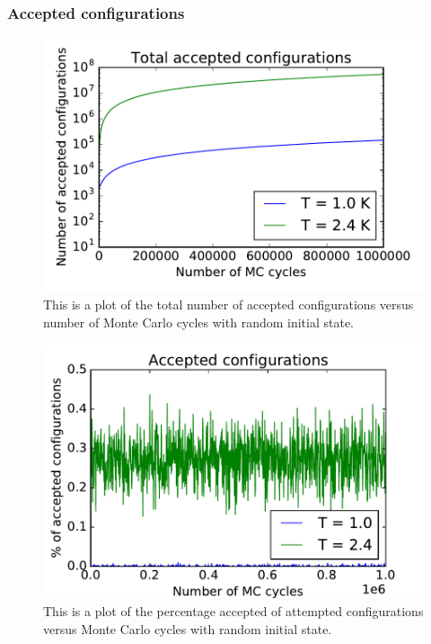\subsubsection{Accepted configurations}

\begin{figure}[H]
\includegraphics[width=\linewidth]{../results/4c/L_20_total_accepted}\caption{This is a plot of the total number of accepted configurations versus number of Monte Carlo cycles with random initial state.}\label{fig:total_accepted}
\end{figure}

\begin{figure}[H]
\includegraphics[width=\linewidth]{../results/4c/L_20_accepted_configs}\caption{This is a plot of the percentage accepted of attempted configurations versus  Monte Carlo cycles with random initial state.}\label{fig:percentage_accepted}
\end{figure}

